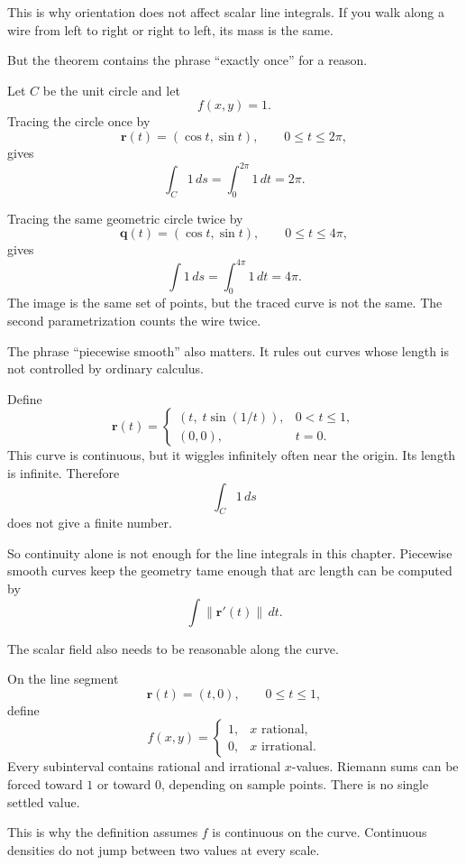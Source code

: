 This is why orientation does not affect scalar line integrals.  If you walk along a wire
from left to right or right to left, its mass is the same.

But the theorem contains the phrase ``exactly once'' for a reason.

\begin{example}
Let \(C\) be the unit circle and let
\[
    f(x,y)=1.
\]
Tracing the circle once by
\[
    \mathbf r(t)=(\cos t,\sin t),
    \qquad 0\le t\le2\pi,
\]
gives
\[
    \int_C 1\,ds
    =
    \int_0^{2\pi}1\,dt
    =
    2\pi.
\]

Tracing the same geometric circle twice by
\[
    \mathbf q(t)=(\cos t,\sin t),
    \qquad 0\le t\le4\pi,
\]
gives
\[
    \int 1\,ds
    =
    \int_0^{4\pi}1\,dt
    =
    4\pi.
\]
The image is the same set of points, but the traced curve is not the same.  The second
parametrization counts the wire twice.
\end{example}

The phrase ``piecewise smooth'' also matters.  It rules out curves whose length is not
controlled by ordinary calculus.

\begin{example}
Define
\[
    \mathbf r(t)=
    \begin{cases}
    (t,\;t\sin(1/t)), & 0<t\le1,\\
    (0,0), & t=0.
    \end{cases}
\]
This curve is continuous, but it wiggles infinitely often near the origin.  Its length is
infinite.  Therefore
\[
    \int_C 1\,ds
\]
does not give a finite number.

So continuity alone is not enough for the line integrals in this chapter.  Piecewise
smooth curves keep the geometry tame enough that arc length can be computed by
\[
    \int \|\mathbf r'(t)\|\,dt.
\]
\end{example}

The scalar field also needs to be reasonable along the curve.

\begin{example}
On the line segment
\[
    \mathbf r(t)=(t,0),
    \qquad 0\le t\le1,
\]
define
\[
    f(x,y)=
    \begin{cases}
    1, & x \text{ rational},\\
    0, & x \text{ irrational}.
    \end{cases}
\]
Every subinterval contains rational and irrational \(x\)-values.  Riemann sums can be
forced toward \(1\) or toward \(0\), depending on sample points.  There is no single
settled value.

This is why the definition assumes \(f\) is continuous on the curve.  Continuous
densities do not jump between two values at every scale.
\end{example}

